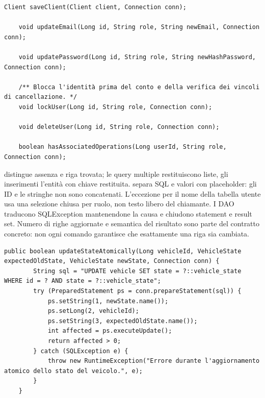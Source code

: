 \noindent\begin{minipage}{\linewidth}
\begin{lstlisting}[firstnumber=29,gobble=4,caption={Selezione delle firme di scrittura con ruolo e Connection.},label=lst:user-dao-comandi]
    Client saveClient(Client client, Connection conn);

    void updateEmail(Long id, String role, String newEmail, Connection conn);

    void updatePassword(Long id, String role, String newHashPassword, Connection conn);

    /** Blocca l'identità prima del conto e della verifica dei vincoli di cancellazione. */
    void lockUser(Long id, String role, Connection conn);

    void deleteUser(Long id, String role, Connection conn);

    boolean hasAssociatedOperations(Long userId, String role, Connection conn);
\end{lstlisting}
\end{minipage}

 distingue assenza e riga trovata; le query multiple
restituiscono liste, gli inserimenti l'entità con chiave restituita.
 separa SQL e valori con placeholder: gli ID e
le stringhe non sono concatenati. L'eccezione per il nome della tabella
utente usa una selezione chiusa per ruolo, non testo libero del chiamante.
I DAO traducono SQLException mantenendone la causa e chiudono statement
e result set. Numero di righe aggiornate e semantica del risultato sono
parte del contratto concreto: non ogni comando garantisce che esattamente
una riga sia cambiata.

\noindent\begin{minipage}{\linewidth}
\begin{lstlisting}[firstnumber=195,caption={\code{PostgresVehicleDao.java}: transizione condizionata e conteggio delle righe.},
  label=lst:update-condizionale]
    public boolean updateStateAtomically(Long vehicleId, VehicleState expectedOldState, VehicleState newState, Connection conn) {
        String sql = "UPDATE vehicle SET state = ?::vehicle_state WHERE id = ? AND state = ?::vehicle_state";
        try (PreparedStatement ps = conn.prepareStatement(sql)) {
            ps.setString(1, newState.name());
            ps.setLong(2, vehicleId);
            ps.setString(3, expectedOldState.name());
            int affected = ps.executeUpdate();
            return affected > 0;
        } catch (SQLException e) {
            throw new RuntimeException("Errore durante l'aggiornamento atomico dello stato del veicolo.", e);
        }
    }
\end{lstlisting}
\end{minipage}

